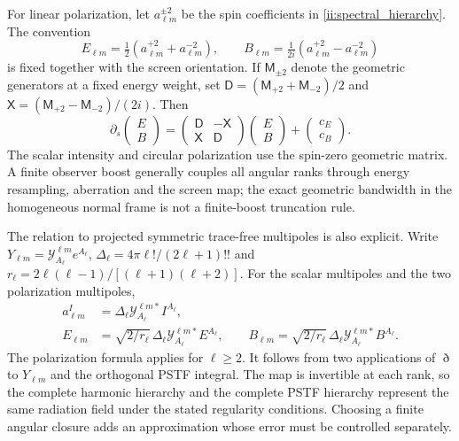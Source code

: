 For linear polarization, let $a^{\pm2}_{\ell m}$ be the spin coefficients in \eqref{ii:spectral_hierarchy}. The convention
\begin{equation}
 E_{\ell m}=\tfrac12(a^{+2}_{\ell m}+a^{-2}_{\ell m}),\qquad
 B_{\ell m}=\tfrac1{2i}(a^{+2}_{\ell m}-a^{-2}_{\ell m})
 \label{ii:EB_definition}
\end{equation}
is fixed together with the screen orientation. If $\mathsf M_{\pm2}$ denote the geometric generators at a fixed energy weight, set
$\mathsf D=(\mathsf M_{+2}+\mathsf M_{-2})/2$ and
$\mathsf X=(\mathsf M_{+2}-\mathsf M_{-2})/(2i)$. Then
\begin{equation}
 \partial_s\begin{pmatrix}E\\B\end{pmatrix}
  =\begin{pmatrix}\mathsf D&-\mathsf X\\\mathsf X&\mathsf D\end{pmatrix}
     \begin{pmatrix}E\\B\end{pmatrix}
    +\begin{pmatrix}c_E\\c_B\end{pmatrix}.
 \label{ii:EB_block}
\end{equation}
The scalar intensity and circular polarization use the spin-zero geometric matrix. A finite observer boost generally couples all angular ranks through energy resampling, aberration and the screen map; the exact geometric bandwidth in the homogeneous normal frame is not a finite-boost truncation rule.

The relation to projected symmetric trace-free multipoles is also explicit. Write
$Y_{\ell m}=\mathcal Y^{\ell m}_{A_\ell}e^{A_\ell}$,
$\Delta_\ell=4\pi\ell!/(2\ell+1)!!$ and
$r_\ell=2\ell(\ell-1)/[(\ell+1)(\ell+2)]$.
For the scalar multipoles and the two polarization multipoles,
\begin{align}
 a^I_{\ell m}&=\Delta_\ell\mathcal Y^{\ell m*}_{A_\ell}I^{A_\ell},\nonumber\\
 E_{\ell m}&=\sqrt{2/r_\ell}\,\Delta_\ell
       \mathcal Y^{\ell m*}_{A_\ell}E^{A_\ell},\qquad
 B_{\ell m}=\sqrt{2/r_\ell}\,\Delta_\ell
       \mathcal Y^{\ell m*}_{A_\ell}B^{A_\ell}.
 \label{ii:pstf_harmonics}
\end{align}
The polarization formula applies for $\ell\ge2$. It follows from two applications of $\eth$ to $Y_{\ell m}$ and the orthogonal PSTF integral. The map is invertible at each rank, so the complete harmonic hierarchy and the complete PSTF hierarchy represent the same radiation field under the stated regularity conditions. Choosing a finite angular closure adds an approximation whose error must be controlled separately.


